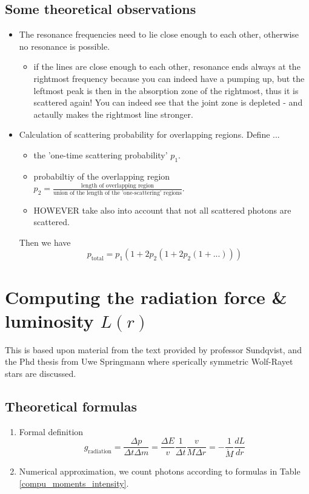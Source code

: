 \documentclass[../main/main.tex]{subfiles}
\begin{document}
\subsection{Some theoretical observations}
\begin{itemize}
\item The resonance frequencies need to lie close enough to each other, otherwise no resonance is possible.

\begin{itemize}
\item if the lines are close enough to each other, resonance ends always at the rightmost frequency because you can indeed have a pumping up, but the leftmost peak is then in the absorption zone of the rightmost, thus it is scattered again! You can indeed see that the joint zone is depleted - and actaully makes the rightmost line stronger.
\end{itemize}


\item Calculation of scattering probability for overlapping regions. Define ...
\begin{itemize}
\item the 'one-time scattering probability' $p_1$.
\item probabiltiy of the overlapping region $p_2 = \frac{\text{length of overlapping region}}{\text{union of the length of the 'one-scattering' regions}}$. 
\item HOWEVER take also into account that not all scattered photons are scattered.
\end{itemize}
Then we have
\begin{equation}
p_{\text{total}} = p_1(1+2p_2(1+2p_2(1+...)))
\end{equation}

\end{itemize}

\newpage
\section{Computing the radiation force \& luminosity $L(r)$}
\label{computing_radiation_force}

This is based upon material from the text provided by professor Sundqvist, and the Phd thesis from Uwe Springmann \cite{UweSpringmannPHD} where sperically symmetric Wolf-Rayet stars are discussed.

\subsection{Theoretical formulas}
\begin{enumerate}
\item Formal definition
\begin{equation}
g_{\text{radiation}} =  \frac{\Delta p}{\Delta t \Delta m} = \frac{\Delta E}{v} \frac{1}{\Delta t} \frac{v}{M \Delta r} = - \frac{1}{\dot{M}}\frac{dL}{dr}
\end{equation}

\item Numerical approximation, we count photons according to formulas in Table \ref{compu_moments_intensity}.
\end{enumerate}
\end{document}
